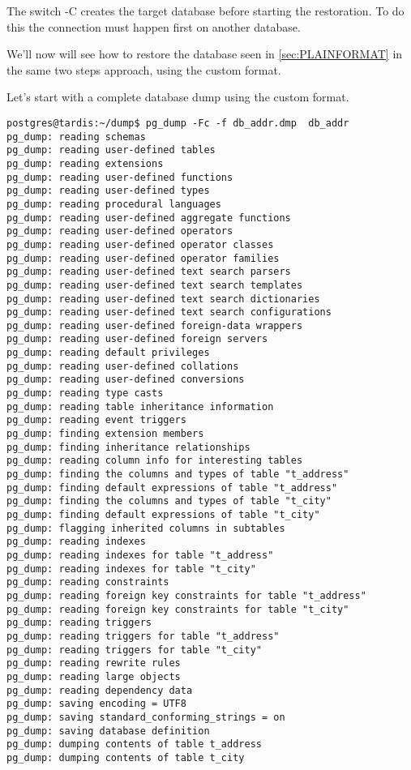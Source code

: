 The switch -C creates the target database before starting the restoration. To do this the 
connection must happen first on another database. \newline

We'll now will see how to restore the database seen in \ref{sec:PLAINFORMAT} in the same two 
steps approach, using the custom format.\newline

Let's start with a complete database dump using the custom format. 

\begin{verbatim}
postgres@tardis:~/dump$ pg_dump -Fc -f db_addr.dmp  db_addr
pg_dump: reading schemas
pg_dump: reading user-defined tables
pg_dump: reading extensions
pg_dump: reading user-defined functions
pg_dump: reading user-defined types
pg_dump: reading procedural languages
pg_dump: reading user-defined aggregate functions
pg_dump: reading user-defined operators
pg_dump: reading user-defined operator classes
pg_dump: reading user-defined operator families
pg_dump: reading user-defined text search parsers
pg_dump: reading user-defined text search templates
pg_dump: reading user-defined text search dictionaries
pg_dump: reading user-defined text search configurations
pg_dump: reading user-defined foreign-data wrappers
pg_dump: reading user-defined foreign servers
pg_dump: reading default privileges
pg_dump: reading user-defined collations
pg_dump: reading user-defined conversions
pg_dump: reading type casts
pg_dump: reading table inheritance information
pg_dump: reading event triggers
pg_dump: finding extension members
pg_dump: finding inheritance relationships
pg_dump: reading column info for interesting tables
pg_dump: finding the columns and types of table "t_address"
pg_dump: finding default expressions of table "t_address"
pg_dump: finding the columns and types of table "t_city"
pg_dump: finding default expressions of table "t_city"
pg_dump: flagging inherited columns in subtables
pg_dump: reading indexes
pg_dump: reading indexes for table "t_address"
pg_dump: reading indexes for table "t_city"
pg_dump: reading constraints
pg_dump: reading foreign key constraints for table "t_address"
pg_dump: reading foreign key constraints for table "t_city"
pg_dump: reading triggers
pg_dump: reading triggers for table "t_address"
pg_dump: reading triggers for table "t_city"
pg_dump: reading rewrite rules
pg_dump: reading large objects
pg_dump: reading dependency data
pg_dump: saving encoding = UTF8
pg_dump: saving standard_conforming_strings = on
pg_dump: saving database definition
pg_dump: dumping contents of table t_address
pg_dump: dumping contents of table t_city

\end{verbatim}


